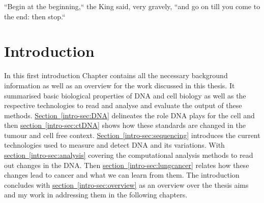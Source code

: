 
\begin{savequote}[85mm]
``Begin at the beginning,`` the King said, very gravely, ``and go on till you come to the end: then stop.``
\end{savequote}

\chapter{Introduction}
\label{ch:intro}



In this first introduction Chapter contains all the necessary background information as well as an overview for the work discussed in this thesis. It summarised basic biological properties of DNA and cell biology as well as the respective technologies to read and analyse and evaluate the output of these methods.
\hyperref[intro-sec:DNA]{Section~\ref*{intro-sec:DNA}} delineates the role DNA plays for the cell and then \hyperref[intro-sec:ctDNA]{section~\ref{intro-sec:ctDNA}} shows how these standards are changed in the tumour and cell free context. \hyperref[intro-sec:sequencing]{Section~\ref{intro-sec:sequencing}} introduces the current technologies used to measure and detect DNA and its variations. With \hyperref[intro-sec:analysis]{section~\ref*{intro-sec:analysis}} covering the computational analysis methods to read out changes in the DNA. Then \hyperref[intro-sec:lungcancer]{section~\ref{intro-sec:lungcancer}} relates how these changes lead to cancer and what we can learn from them. 
The introduction concludes with \hyperref[intro-sec:overview]{section~\ref*{intro-sec:overview}} as an overview over the thesis aims and my work in addressing them in the following chapters.














